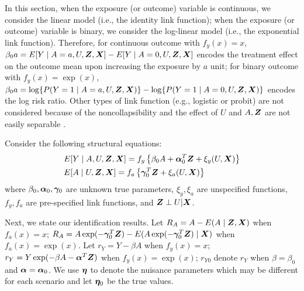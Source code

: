 \documentclass[12pt]{article}
\begin{document}
{In this section, when the exposure (or outcome) variable is continuous, we consider the linear model (i.e., the identity link function); when the exposure (or outcome) variable is binary, we consider the log-linear model (i.e., the exponential link function). Therefore, for continuous outcome with $ f_y(x)=x $, $ \beta_0 a = E[Y\mid 
A=a, U, \bm{Z}, \bm{X}]- E[Y\mid A=0, U, \bm{Z}, \bm{X}]$ encodes the treatment effect on the outcome mean upon increasing the exposure by $ a $ unit; for binary outcome with  $ f_y(x)=\exp(x) $, $ \beta_0 a = \log\{ P(Y=1\mid A=a, U, \bm{Z}, \bm{X})\}- \log \{ P(Y=1\mid A=0, U, \bm{Z}, \bm{X})\}$ encodes the log risk ratio. Other types of link function (e.g., logistic or probit) are not considered because of the noncollapsibility \citep{Baiocchi:2014aa} and the effect of $ U $ and $ A, \bm{Z} $ are not easily separable \citep{Clarke:2010aa}. 

Consider the following structural equations:
\begin{align}
	& E[Y\mid A,  U, \bm{Z}, \bm{X}]=f_y\left\{\beta_0A+ \bm \alpha_0^T  \bm{Z} +\xi_y(U,\bm{X})\right\}\label{eq: out model X general}\\
	& E[A\mid U, \bm{Z}, \bm{X}]=f_a \left\{ \bm \gamma^T_0 \bm{Z}+ \xi_a(U, \bm{X})\right\} \label{eq: exp model X general}
\end{align}
where $ \beta_0, \bm \alpha_0, \bm \gamma_0 $ are unknown true parameters, $  \xi_y, \xi_a$ are unspecified functions, $ f_y, f_a$ are pre-specified link functions, and $ \bm{Z}\perp U|\bm{X} $. 


Next, we state our identification results. Let $ R_A= A- E(A\mid \bm{Z}, \bm{X}) $ when $ f_a(x)=x $; $ R_A= A\exp(- \bm \gamma_0^T \bm{Z}) - E(  A\exp(- \bm \gamma_0^T \bm{Z})\mid \bm{X} )$ when $ f_a(x)=\exp(x) $.  Let $ r_Y= Y-\beta A $ when $ f_y(x)=x $; $ r_Y = Y\exp(-\beta A- \bm \alpha^T \bm{Z}) $ when $ f_y(x)= \exp(x) $; $ r_{Y0} $  denote $ r_Y $ when $ \beta=\beta_0 $ and $ \bm \alpha=\bm \alpha_0 $. We use  $ \bm \eta $ to denote the nuisance parameters which may be different for each scenario  and let $ \bm \eta_0 $ be the true values. 


}
\end{document}
